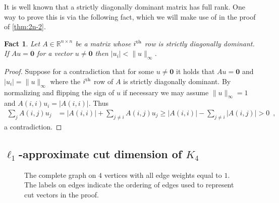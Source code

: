 \documentclass[10pt,a4paper]{article}
\newcommand{\R}{\mathbb{R}}
\newcommand{\zero}{\mathbf{0}}
\newcommand{\ith}{i^{\scriptsize \mbox{{\rm th}}}}
\newcommand{\1}{\mathbf{1}}
\newtheorem{fact}[theorem]{Fact}
\theoremstyle{definition}
\begin{document}
It is well known that a strictly diagonally dominant matrix has full rank.
One way to prove this is via the following fact, which we will make use of in the proof of \cref{thm:2n-2}.
\begin{fact}
\label{fact:sdd}
Let $A \in \R^{n \times n}$ be a matrix whose $\ith$ row is strictly diagonally dominant.
If $A u = \zero$ for a vector $u \ne \zero$ then $|u_i| < \|u\|_\infty$.
\end{fact}

\begin{proof}
Suppose for a contradiction that for some $u \ne \zero$ it holds that $A u = \zero$ and $|u_i| = \|u\|_\infty$
where the $\ith$ row of $A$ is strictly diagonally dominant.
By normalizing and flipping the sign of $u$ if necessary we may assume $\|u\|_\infty =1$ and $A(i,i) u_i = |A(i,i)|$.  Thus
\begin{align*}
\sum_j A(i,j) u_j &= |A(i,i)| + \sum_{j \ne i} A(i,j) u_j \ge |A(i,i)| - \sum_{j \ne i} |A(i,j)| > 0 \enspace ,
\end{align*}
a contradiction.
\end{proof}


\subsection{$\ell_1$-approximate cut dimension of $K_4$}
\begin{figure}
\centering
{}
\caption{The complete graph on $4$ vertices with all edge weights equal to $1$.  The labels on edges indicate the
ordering of edges used to represent cut vectors in the proof.}
\label{fig:K4}
\end{figure}
\end{document}
